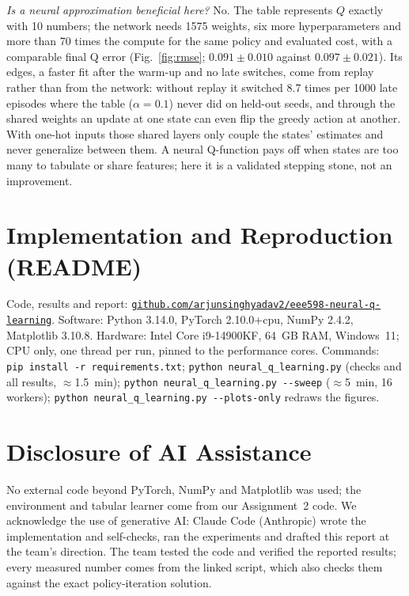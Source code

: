\documentclass[conference]{IEEEtran}
\newcommand{\code}[1]{\texttt{#1}}
\newcommand{\repo}{\href{https://github.com/arjunsinghyadav2/eee598-neural-q-learning}{%
\nolinkurl{github.com/arjunsinghyadav2/eee598-neural-q-learning}}}
\begin{document}
\emph{Is a neural approximation beneficial here?} No. The table represents $Q$ exactly with 10
numbers; the network needs 1575 weights, six more hyperparameters and more than 70 times the
compute for the same policy and evaluated cost, with a comparable final Q error
(Fig.~\ref{fig:rmse}; $0.091\pm0.010$ against $0.097\pm0.021$). Its edges, a faster fit after
the warm-up and no late switches, come from replay rather than from the network: without replay
it switched 8.7 times per 1000 late episodes where the table ($\alpha=0.1$) never did on
held-out seeds, and through the shared weights an update at one state can even flip the greedy
action at another. With one-hot inputs those shared layers only couple the states' estimates
and never generalize between them. A neural Q-function pays off when states are too many to
tabulate or share features; here it is a validated stepping stone, not an improvement.

\section*{Implementation and Reproduction (README)}
{\raggedright Code, results and report: \repo. Software: Python 3.14.0, PyTorch 2.10.0+cpu, NumPy 2.4.2, Matplotlib 3.10.8. Hardware:
Intel Core i9-14900KF, 64~GB RAM, Windows~11; CPU only, one thread per run, pinned to the
performance cores. Commands:
\code{pip~install~-r~requirements.txt}; \code{python~neural\_q\_learning.py} (checks and all
results, $\approx$1.5~min);
\code{python~neural\_q\_learning.py~-{}-sweep} ($\approx$5~min, 16 workers);
\code{python~neural\_q\_learning.py~-{}-plots-only} redraws the figures.\par}

\section*{Disclosure of AI Assistance}
No external code beyond PyTorch, NumPy and Matplotlib was used; the environment and tabular
learner come from our Assignment~2 code. We acknowledge the use of generative AI: Claude Code
(Anthropic) wrote the implementation and self-checks, ran the experiments and drafted this
report at the team's direction. The team tested the code and verified the reported results;
every measured number comes from the linked script, which also checks them against the exact
policy-iteration solution.
\end{document}
